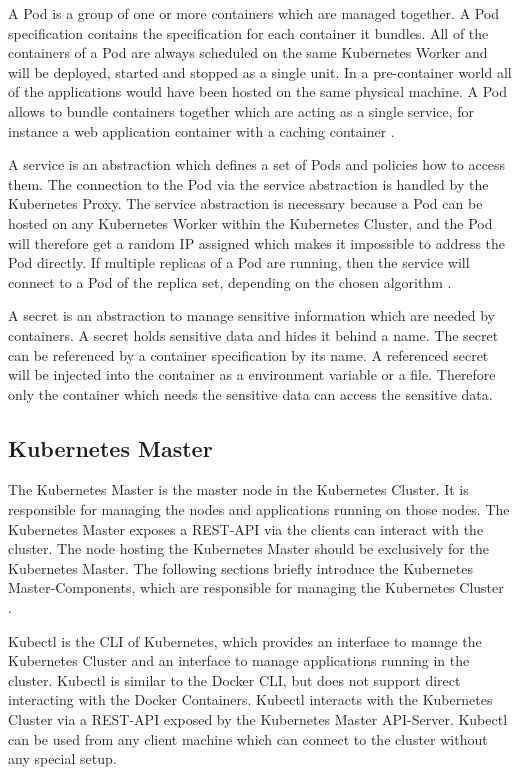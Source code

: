 A Pod is a group of one or more containers which are managed together. A Pod specification contains the specification for each container it bundles. All of the containers of a Pod are always scheduled on the same Kubernetes Worker and will be deployed, started and stopped as a single unit. In a pre-container world all of the applications would have been hosted on the same physical machine. A Pod allows to bundle containers together which are acting as a single service, for instance a web application container with a caching container \cite{CNCFKubernetesPods2018}. 

A service is an abstraction which defines a set of Pods and policies how to access them. The connection to the Pod via the service abstraction is handled by the Kubernetes Proxy. The service abstraction is necessary because a Pod can be hosted on any Kubernetes Worker within the Kubernetes Cluster,  and the Pod will therefore get a random IP assigned which makes it impossible to address the Pod directly. If multiple replicas of a Pod are running, then the service will connect to a Pod of the replica set, depending on the chosen algorithm \cite{CNCFKubernetesServices2018}.

A secret is an abstraction to manage sensitive information which are needed by containers. A secret holds sensitive data and hides it behind a name. The secret can be referenced by a container specification by its name. A referenced secret will be injected into the container as a environment variable or a file. Therefore only the container which needs the sensitive data can access the sensitive data. 

\subsection{Kubernetes Master}
\label{sec:caas-kubernetes-master}
The Kubernetes Master is the master node in the Kubernetes Cluster. It is responsible for managing the nodes and applications running on those nodes. The Kubernetes Master exposes a REST-API via the clients can interact with the cluster. The node hosting the Kubernetes Master should be exclusively for the Kubernetes Master. The following sections briefly introduce the Kubernetes Master-Components, which are responsible for managing the Kubernetes Cluster \cite{CNCFKubernetesComponents2018}.

Kubectl is the CLI of Kubernetes, which provides an interface to manage the Kubernetes Cluster and an interface to manage applications running in the cluster. Kubectl is similar to the Docker CLI, but does not support direct interacting with the Docker Containers. Kubectl interacts with the Kubernetes Cluster via a REST-API exposed by the Kubernetes Master API-Server. Kubectl can be used from any client machine which can connect to the cluster without any special setup.

